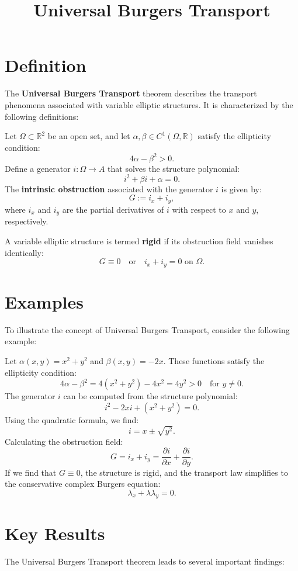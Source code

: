 \documentclass[11pt,a4paper]{article}
\title{Universal Burgers Transport}
\date{}
\begin{document}
\maketitle
\section{Definition}
The \textbf{Universal Burgers Transport} theorem describes the transport phenomena associated with variable elliptic structures. It is characterized by the following definitions:

\begin{definition}
Let $\Omega \subset \mathbb{R}^2$ be an open set, and let $\alpha, \beta \in C^1(\Omega, \mathbb{R})$ satisfy the ellipticity condition:
$$
4\alpha - \beta^2 > 0.
$$
Define a generator $i: \Omega \to A$ that solves the structure polynomial:
$$
i^2 + \beta i + \alpha = 0.
$$
The \textbf{intrinsic obstruction} associated with the generator $i$ is given by:
$$
G := i_x + i_y,
$$
where $i_x$ and $i_y$ are the partial derivatives of $i$ with respect to $x$ and $y$, respectively.
\end{definition}

A variable elliptic structure is termed \textbf{rigid} if its obstruction field vanishes identically:
$$
G \equiv 0 \quad \text{or} \quad i_x + i_y = 0 \text{ on } \Omega.
$$

\section{Examples}
To illustrate the concept of Universal Burgers Transport, consider the following example:

\begin{example}
Let $\alpha(x, y) = x^2 + y^2$ and $\beta(x, y) = -2x$. These functions satisfy the ellipticity condition:
$$
4\alpha - \beta^2 = 4(x^2 + y^2) - 4x^2 = 4y^2 > 0 \quad \text{for } y \neq 0.
$$
The generator $i$ can be computed from the structure polynomial:
$$
i^2 - 2xi + (x^2 + y^2) = 0.
$$
Using the quadratic formula, we find:
$$
i = x \pm \sqrt{y^2}.
$$
Calculating the obstruction field:
$$
G = i_x + i_y = \frac{\partial i}{\partial x} + \frac{\partial i}{\partial y}.
$$
If we find that $G \equiv 0$, the structure is rigid, and the transport law simplifies to the conservative complex Burgers equation:
$$
\lambda_x + \lambda \lambda_y = 0.
$$
\end{example}

\section{Key Results}
The Universal Burgers Transport theorem leads to several important findings:
\end{document}
